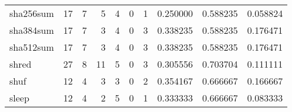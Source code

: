 \begin{tabular}{lrrrrrrrrr}
sha256sum &                                      17 &                                                  7 &                                                  5 &                                                  4 &                                                  0 &                                                  1 &                                           0.250000 &                               0.588235 &                             0.058824 \\
sha384sum &                                      17 &                                                  7 &                                                  3 &                                                  4 &                                                  0 &                                                  3 &                                           0.338235 &                               0.588235 &                             0.176471 \\
sha512sum &                                      17 &                                                  7 &                                                  3 &                                                  4 &                                                  0 &                                                  3 &                                           0.338235 &                               0.588235 &                             0.176471 \\
shred     &                                      27 &                                                  8 &                                                 11 &                                                  5 &                                                  0 &                                                  3 &                                           0.305556 &                               0.703704 &                             0.111111 \\
shuf      &                                      12 &                                                  4 &                                                  3 &                                                  3 &                                                  0 &                                                  2 &                                           0.354167 &                               0.666667 &                             0.166667 \\
sleep     &                                      12 &                                                  4 &                                                  2 &                                                  5 &                                                  0 &                                                  1 &                                           0.333333 &                               0.666667 &                             0.083333 \\

\end{tabular}
